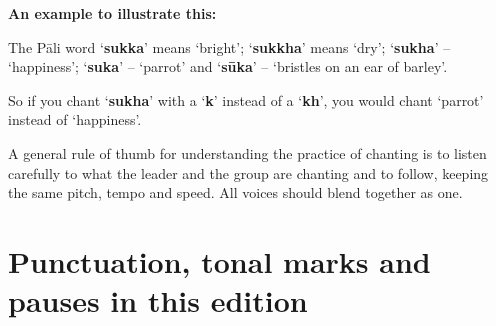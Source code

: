 \textbf{An example to illustrate this:}

The Pāli word ‘\textbf{sukka}’ means ‘bright’; ‘\textbf{sukkha}’ means
‘dry’; ‘\textbf{sukha}’ – ‘happiness’; ‘\textbf{suka}’ – ‘parrot’ and
‘\textbf{sūka}’ – ‘bristles on an ear of barley’.

So if you chant ‘\textbf{sukha}’ with a ‘\textbf{k}’ instead of a
‘\textbf{kh}’, you would chant ‘parrot’ instead of ‘happiness’.

A general rule of thumb for understanding the practice of chanting is to
listen carefully to what the leader and the group are chanting and to
follow, keeping the same pitch, tempo and speed. All voices should blend
together as one.

\section{Punctuation, tonal marks and pauses in this edition}


%
%
%
%
%

